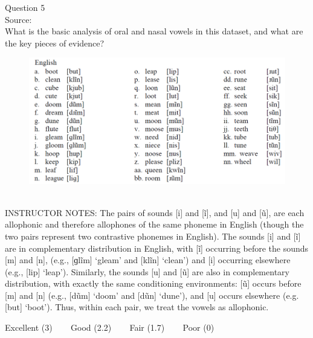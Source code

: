 \documentclass[12pt]{article}
\begin{document}
{\large Question 5}\\

Source: \\

What is the basic analysis of oral and nasal vowels in this dataset, and what are the key pieces of evidence?\\

\begin{figure}[H]
\includegraphics{../images/english12.png}
\end{figure}

~\\
INSTRUCTOR NOTES: The pairs of sounds [i] and [ĩ], and [u] and [ũ], are each allophonic and therefore allophones of the same phoneme in English (though the two pairs represent two contrastive phonemes in English). The sounds [i] and [ĩ] are in complementary distribution in English, with [ĩ] occurring before the sounds [m] and [n], (e.g., [ɡlĩm] ‘gleam’ and [klĩn] ‘clean’) and [i] occurring elsewhere (e.g., [lip] ‘leap’). Similarly, the sounds [u] and [ũ] are also in complementary distribution, with exactly the same conditioning environments: [ũ] occurs before [m] and [n] (e.g., [dũm] ‘doom’ and [dũn] ‘dune’), and [u] occurs elsewhere (e.g. [but] ‘boot’). Thus, within each pair, we treat the vowels as allophonic. 


\vfill
Excellent (3) ~~~ Good (2.2) ~~~ Fair (1.7) ~~~ Poor (0)
\newpage

\begin{center}
\textbf{{\color{red}{\HUGE END OF EXAM}}}\\

\end{center}
\newpage

\begin{center}
\textbf{{\color{blue}{\HUGE START OF EXAM\\}}}

\textbf{{\color{blue}{\HUGE Student ID: 84480\\}}}

\textbf{{\color{blue}{\HUGE \\}}}

\end{center}
\newpage
\end{document}
